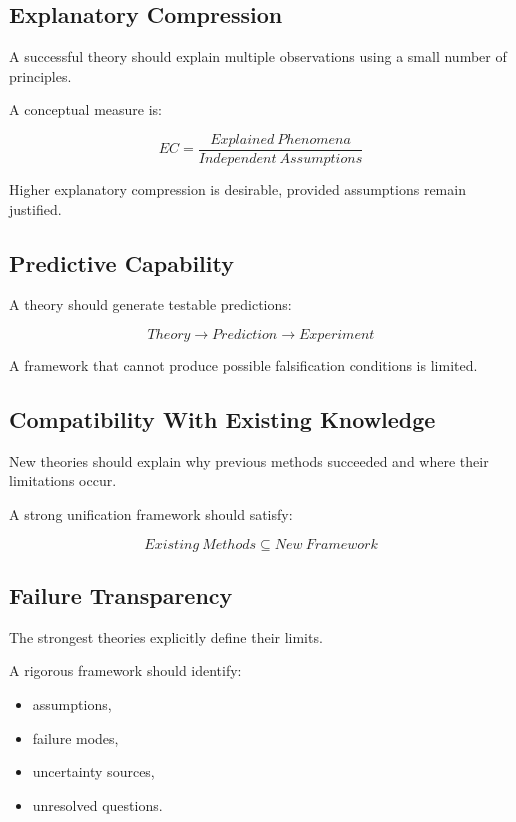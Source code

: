 \documentclass[11pt]{article}
\begin{document}
\subsection{Explanatory Compression}


A successful theory should explain multiple observations using a small
number of principles.


A conceptual measure is:


\[
EC
=
\frac{
Explained\ Phenomena
}
{
Independent\ Assumptions
}
\]


Higher explanatory compression is desirable, provided assumptions
remain justified.



\subsection{Predictive Capability}


A theory should generate testable predictions:


\[
Theory
\rightarrow
Prediction
\rightarrow
Experiment
\]


A framework that cannot produce possible falsification conditions is
limited.



\subsection{Compatibility With Existing Knowledge}


New theories should explain why previous methods succeeded and where
their limitations occur.



A strong unification framework should satisfy:


\[
Existing\ Methods
\subseteq
New\ Framework
\]



\subsection{Failure Transparency}


The strongest theories explicitly define their limits.


A rigorous framework should identify:


\begin{itemize}

\item assumptions,

\item failure modes,

\item uncertainty sources,

\item unresolved questions.

\end{itemize}
\end{document}
